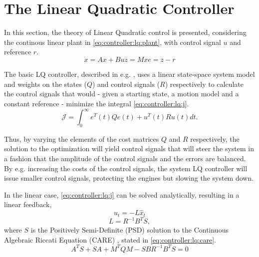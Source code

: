 \section{The Linear Quadratic Controller}
\label{sec:controller:lq}
    In this section, the theory of Linear Quadratic control is presented,
    considering the continous linear plant in \eqref{eq:controller:lq:plant},
    with control signal $u$ and reference $r$.
    \begin{subequations}
        \label{eq:controller:lq:plant}
        \begin{equation}
            \dot{x} = Ax + Bu
        \end{equation}
        \begin{equation}
            z = Mx
        \end{equation}
        \begin{equation}
            e = z - r
        \end{equation}
    \end{subequations}

    The basic LQ controller, described in e.g. \citep{glad2003reglerteori},
    uses a linear state-space system model and weights on the states ($Q$) and control
    signals ($R$) respectively to calculate the control signals that would
    - given a starting state, a motion model and a constant reference -
    minimize the integral \eqref{eq:controller:lq:j}.
    \begin{equation}
    \label{eq:controller:lq:j}
        \mathcal{J} = \int_{0}^{\infty} e^{T}(t)Qe(t) + u^{T}(t)Ru(t) dt.
    \end{equation}

    Thus, by varying the elements of the cost matrices $Q$ and $R$
    respectively, the solution to the optimization will yield control
    signals that will steer the system in a fashion that the amplitude
    of the control signals and the errors are balanced.
    By e.g. increasing the costs of the control signals, the system
    LQ controller will issue smaller control signals, protecting the
    engines but slowing the system down.

    In the linear case, \eqref{eq:controller:lq:j} can be solved analytically,
    resulting in a linear feedback,
    \begin{equation}
    \label{eq:controller:u1}
        u_{t} = -L\hat{x}_{t}
    \end{equation}
    \begin{equation}
    \label{eq:controller:L}
        L = R^{-1}B^{T}S,
    \end{equation}
    where $S$ is the Positively Semi-Definite (PSD) solution to the
    Continuous Algebraic Riccati Equation (CARE) \citep{glad2003reglerteori}, stated in \eqref{eq:controller:lq:care}.
    \begin{equation}
        \label{eq:controller:lq:care}
        A^{T}S + SA + M^{T}QM - SBR^{-1}B^{T}S = 0
    \end{equation}

